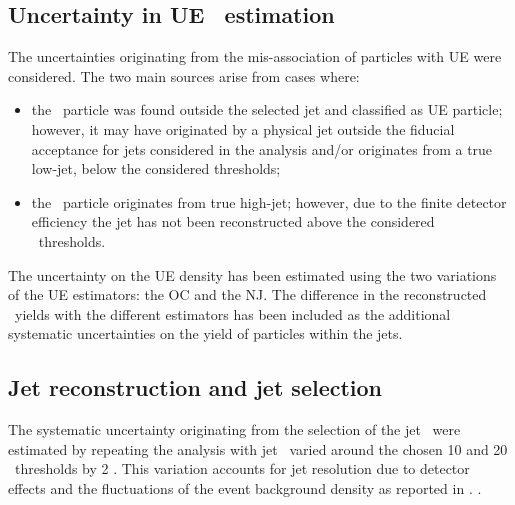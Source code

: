 \subsection{Uncertainty in UE \Vzero\ estimation}

The uncertainties originating from the mis-association of \Vzero particles with UE were considered. The two main sources arise from cases where:
\begin{itemize}
\item the \Vzero\ particle was found outside the selected jet and classified as UE particle; however, it may have originated by a physical jet outside the fiducial acceptance for jets considered in the analysis and/or originates from a true low-\pt jet, below the considered thresholds;
\item the \Vzero\ particle originates from true high-\pt jet; however, due to the finite detector efficiency the jet has not been reconstructed above the considered \pt\ thresholds.
\end{itemize}
The uncertainty on the UE \Vzero density has been estimated using the two variations of the UE estimators: the OC and the NJ. The difference in the reconstructed \Vzero\ yields with the different estimators has been included as the additional systematic uncertainties on the yield of particles within the jets.

\subsection{Jet reconstruction and jet selection}

The systematic uncertainty originating from the selection of the jet \pt\ were estimated by repeating the analysis with jet \pt\ varied around the chosen 10 and 20 \gevc\ thresholds by 2 \gevc. This variation accounts for jet resolution due to detector effects and the fluctuations of the event background density as reported in \cite{Adam:2015hoa}. . 

